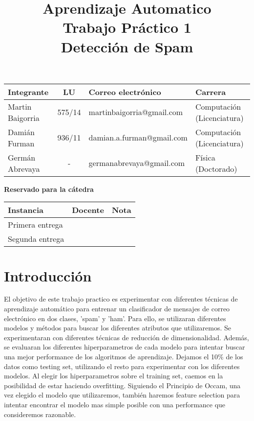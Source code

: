 \documentclass[10pt,a4paper]{article}
\title{Aprendizaje Automatico \\ Trabajo Práctico 1 \\ Detección de Spam }
\begin{document}

\maketitle

\bigskip

\begin{table}[h]
\centering
\begin{tabular}{|l l l l|}
\hline
Integrante       & \multicolumn{1}{c}{LU}     & Correo electrónico       	& Carrera \\ \hline
Martin Baigorria & \multicolumn{1}{c}{575/14} & martinbaigorria@gmail.com & Computación (Licenciatura) \\ 
Damián Furman & \multicolumn{1}{c}{936/11}& damian.a.furman@gmail.com & Computación (Licenciatura)\\
Germán Abrevaya & \multicolumn{1}{c}{-} & germanabrevaya@gmail.com & Física (Doctorado)\\ \hline
\end{tabular}
\end{table}

\vfill

\begin{center}
\textbf{Reservado para la cátedra}
\end{center}
\begin{table}[h]
\centering
\begin{tabular}{|l|l|l|}
\hline
Instancia       & Docente & Nota \\ \hline
Primera entrega &         &      \\ \hline
Segunda entrega &         &      \\ \hline
\end{tabular}
\end{table}

\newpage
\tableofcontents
\newpage


\section{Introducción}

El objetivo de este trabajo practico es experimentar con diferentes técnicas de aprendizaje automático para entrenar un clasificador de mensajes de correo electrónico en dos clases, 'spam' y 'ham'. Para ello, se utilizaran diferentes modelos y métodos para buscar los diferentes atributos que utilizaremos. Se experimentaran con diferentes técnicas de reducción de dimensionalidad. Además, se evaluaran los diferentes hiperparametros de cada modelo para intentar buscar una mejor performance de los algoritmos de aprendizaje. Dejamos el 10\% de los datos como testing set, utilizando el resto para experimentar con los diferentes modelos. Al elegir los hiperparametros sobre el training set, caemos en la posibilidad de estar haciendo overfitting. Siguiendo el Principio de Occam, una vez elegido el modelo que utilizaremos, también haremos feature selection para intentar encontrar el modelo mas simple posible con una performance que consideremos razonable.
\end{document}
